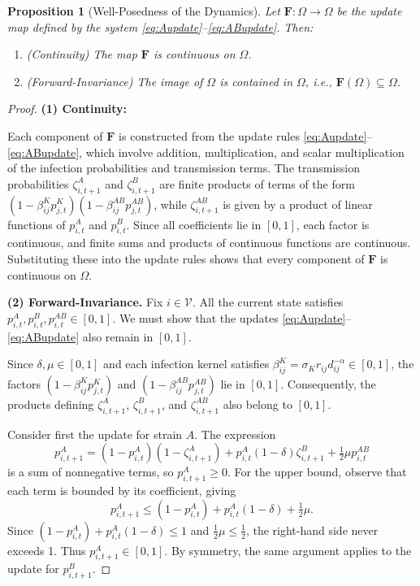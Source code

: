 \documentclass[a4paper,12pt]{scrartcl}
\theoremstyle{plain}%
\newtheorem{proposition}[theorem]{Proposition}
\theoremstyle{definition}
\theoremstyle{remark}
\numberwithin{equation}{section}
\begin{document}
\begin{proposition}[Well-Posedness of the Dynamics]
Let \( \mathbf{F} : \Omega \to \Omega \) be the update map defined by the system \eqref{eq:Aupdate}–\eqref{eq:ABupdate}. Then:
\begin{enumerate}
    \item \emph{(Continuity)} The map \( \mathbf{F} \) is continuous on \( \Omega \).
    \item \emph{(Forward-Invariance)} The image of \( \Omega \) is contained in \( \Omega \), i.e., \( \mathbf{F}(\Omega) \subseteq \Omega \).
\end{enumerate}
\end{proposition}

\begin{proof} {}

\textbf{(1) Continuity:} 

Each component of \( \mathbf{F} \) is constructed from the update rules \eqref{eq:Aupdate}–\eqref{eq:ABupdate}, which involve addition, multiplication, and scalar multiplication of the infection probabilities and transmission terms. The transmission probabilities \(\zeta_{i,t+1}^A\) and \(\zeta_{i,t+1}^B\) are finite products of terms of the form \((1 - \beta_{ij}^K p_{j,t}^K)(1 - \beta_{ij}^{AB} p_{j,t}^{AB})\), while \(\zeta_{i,t+1}^{AB}\) is given by a product of linear functions of \(p_{i,t}^A\) and \(p_{i,t}^B\). Since all coefficients lie in \([0,1]\), each factor is continuous, and finite sums and products of continuous functions are continuous. Substituting these into the update rules shows that every component of \( \mathbf{F} \) is continuous on \(\Omega\).

\textbf{(2) Forward-Invariance.}  
Fix \( i \in \mathcal{V} \). All the current state satisfies \( p_{i,t}^A, p_{i,t}^B, p_{i,t}^{AB} \in [0,1] \). We must show that the updates \eqref{eq:Aupdate}–\eqref{eq:ABupdate} also remain in \([0,1]\).  

Since \( \delta, \mu \in [0,1] \) and each infection kernel satisfies \( \beta_{ij}^K = \sigma_K r_{ij} d_{ij}^{-\alpha} \in [0,1] \), the factors 
\((1 - \beta_{ij}^K p_{j,t}^K)\) and \((1 - \beta_{ij}^{AB} p_{j,t}^{AB})\) lie in \([0,1]\). Consequently, the products defining 
\(\zeta_{i,t+1}^A\), \(\zeta_{i,t+1}^B\), and \(\zeta_{i,t+1}^{AB}\) also belong to \([0,1]\).  

Consider first the update for strain \(A\). The expression  
\[
p_{i,t+1}^A = (1-p_{i,t}^A)(1-\zeta_{i,t+1}^A) 
+ p_{i,t}^A (1-\delta)\zeta_{i,t+1}^B 
+ \tfrac{1}{2}\mu p_{i,t}^{AB}
\]  
is a sum of nonnegative terms, so \(p_{i,t+1}^A \geq 0\). For the upper bound, observe that each term is bounded by its coefficient, giving  
\[
p_{i,t+1}^A \leq (1-p_{i,t}^A) + p_{i,t}^A(1-\delta) + \tfrac{1}{2}\mu.
\]  
Since \((1-p_{i,t}^A) + p_{i,t}^A(1-\delta) \leq 1\) and \(\tfrac{1}{2}\mu \leq \tfrac{1}{2}\), the right-hand side never exceeds 1. Thus \(p_{i,t+1}^A \in [0,1]\). By symmetry, the same argument applies to the update for \(p_{i,t+1}^B\).  


\end{proof}
\end{document}
